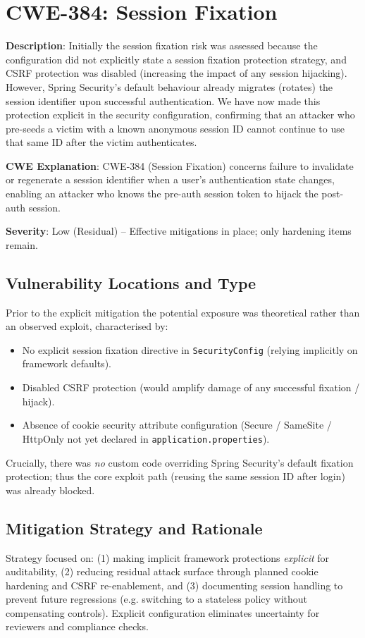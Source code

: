 \documentclass[]{UCD_CS_FYP_Report}
\begin{document}
\section{CWE-384: Session Fixation}

	\textbf{Description}: Initially the session fixation risk was assessed because the configuration did not explicitly state a session fixation protection strategy, and CSRF protection was disabled (increasing the impact of any session hijacking). However, Spring Security's default behaviour already migrates (rotates) the session identifier upon successful authentication. We have now made this protection explicit in the security configuration, confirming that an attacker who pre-seeds a victim with a known anonymous session ID cannot continue to use that same ID after the victim authenticates.

	\textbf{CWE Explanation}: CWE-384 (Session Fixation) concerns failure to invalidate or regenerate a session identifier when a user's authentication state changes, enabling an attacker who knows the pre-auth session token to hijack the post-auth session.

	\textbf{Severity}: Low (Residual) – Effective mitigations in place; only hardening items remain.

\subsection*{Vulnerability Locations and Type}
Prior to the explicit mitigation the potential exposure was theoretical rather than an observed exploit, characterised by:
\begin{itemize}
	\item No explicit session fixation directive in \texttt{SecurityConfig} (relying implicitly on framework defaults).\newline
	\item Disabled CSRF protection (would amplify damage of any successful fixation / hijack).\newline
	\item Absence of cookie security attribute configuration (Secure / SameSite / HttpOnly not yet declared in \texttt{application.properties}).
\end{itemize}
Crucially, there was \emph{no} custom code overriding Spring Security's default fixation protection; thus the core exploit path (reusing the same session ID after login) was already blocked.

\subsection*{Mitigation Strategy and Rationale}
Strategy focused on: (1) making implicit framework protections \emph{explicit} for auditability, (2) reducing residual attack surface through planned cookie hardening and CSRF re-enablement, and (3) documenting session handling to prevent future regressions (e.g. switching to a stateless policy without compensating controls). Explicit configuration eliminates uncertainty for reviewers and compliance checks.
\end{document}
